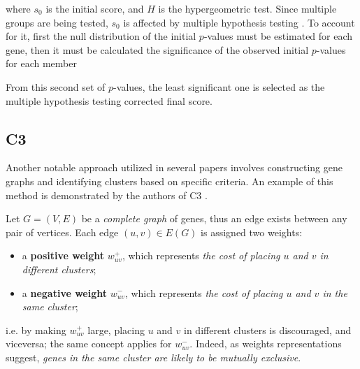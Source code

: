 where $s_0$ is the initial score, and $H$ is the hypergeometric test. Since multiple groups are being tested, $s_0$ is affected by multiple hypothesis testing . To account for it, first the null distribution of the initial $p$-values must be estimated for each gene, then it must be calculated the significance of the observed initial $p$-values for each member 

From this second set of $p$-values, the least significant one is selected as the multiple hypothesis testing corrected final score. 

\subsection{C3}

Another notable approach utilized in several papers involves constructing gene graphs and identifying clusters based on specific criteria. An example of this method is demonstrated by the authors of C3 \cite{c3}.

Let $G = (V, E)$ be a \textit{complete graph} of genes, thus an edge exists between any pair of vertices. Each edge $(u, v) \in E(G)$ is assigned two weights:

\begin{itemize}
    \item a \textbf{positive weight} $w_{uv}^+$, which represents \textit{the cost of placing $u$ and $v$ in different clusters};
    \item a \textbf{negative weight} $w_{uv}^-$, which represents \textit{the cost of placing $u$ and $v$ in the same cluster};
\end{itemize}

i.e. by making $w_{uv}^+$ large, placing $u$ and $v$ in different clusters is discouraged, and viceversa; the same concept applies for $w_{uv}^-$. Indeed, as weights representations suggest, \textit{genes in the same cluster are likely to be mutually exclusive}.

